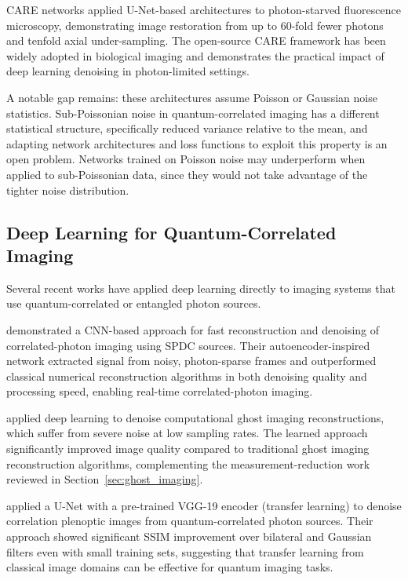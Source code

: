 CARE networks \citep{weigert2018} applied U-Net-based architectures to photon-starved fluorescence microscopy, demonstrating image restoration from up to 60-fold fewer photons and tenfold axial under-sampling. The open-source CARE framework has been widely adopted in biological imaging and demonstrates the practical impact of deep learning denoising in photon-limited settings.

A notable gap remains: these architectures assume Poisson or Gaussian noise statistics. Sub-Poissonian noise in quantum-correlated imaging has a different statistical structure, specifically reduced variance relative to the mean, and adapting network architectures and loss functions to exploit this property is an open problem. Networks trained on Poisson noise may underperform when applied to sub-Poissonian data, since they would not take advantage of the tighter noise distribution.

\subsection{Deep Learning for Quantum-Correlated Imaging}

Several recent works have applied deep learning directly to imaging systems that use quantum-correlated or entangled photon sources.

\citet{li2021} demonstrated a CNN-based approach for fast reconstruction and denoising of correlated-photon imaging using SPDC sources. Their autoencoder-inspired network extracted signal from noisy, photon-sparse frames and outperformed classical numerical reconstruction algorithms in both denoising quality and processing speed, enabling real-time correlated-photon imaging.

\citet{wu2020} applied deep learning to denoise computational ghost imaging reconstructions, which suffer from severe noise at low sampling rates. The learned approach significantly improved image quality compared to traditional ghost imaging reconstruction algorithms, complementing the measurement-reduction work reviewed in Section~\ref{sec:ghost_imaging}.

\citet{scattarella2023} applied a U-Net with a pre-trained VGG-19 encoder (transfer learning) to denoise correlation plenoptic images from quantum-correlated photon sources. Their approach showed significant SSIM improvement over bilateral and Gaussian filters even with small training sets, suggesting that transfer learning from classical image domains can be effective for quantum imaging tasks.

